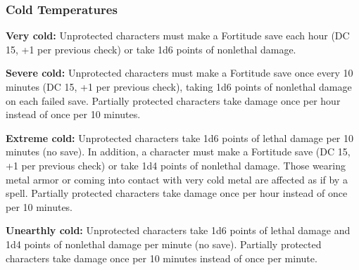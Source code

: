 \subsubsection{Cold Temperatures}
\textbf{Very cold:} Unprotected characters must make a Fortitude save each hour (DC 15, +1 per previous check) or take 1d6 points of nonlethal damage. 

\textbf{Severe cold:} Unprotected characters must make a Fortitude save once every 10 minutes (DC 15, +1 per previous check), taking 1d6 points of nonlethal damage on each failed save. Partially protected characters take damage once per hour instead of once per 10 minutes.

\textbf{Extreme cold:} Unprotected characters take 1d6 points of lethal damage per 10 minutes (no save). In addition, a character must make a Fortitude save (DC 15, +1 per previous check) or take 1d4 points of nonlethal damage. Those wearing metal armor or coming into contact with very cold metal are affected as if by a  spell. Partially protected characters take damage once per hour instead of once per 10 minutes.

\textbf{Unearthly cold:} Unprotected characters take 1d6 points of lethal damage and 1d4 points of nonlethal damage per minute (no save). Partially protected characters take damage once per 10 minutes instead of once per minute.



